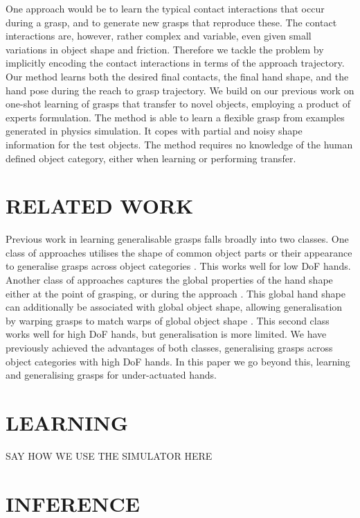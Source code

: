 \documentclass[a4paper, 10pt, conference]{ieeeconf}      %
\begin{document}
One approach would be to learn the typical contact interactions that occur during a grasp, and to generate new grasps that reproduce these. The contact interactions are, however, rather complex and variable, even given small variations in object shape and friction. Therefore we tackle the problem by implicitly encoding the contact interactions in terms of the approach trajectory. Our method learns both the desired final contacts, the final hand shape, and the hand pose during the reach to grasp trajectory. We build on our previous work on one-shot learning of grasps that transfer to novel objects, employing a product of experts formulation. The method is able to learn a flexible grasp from examples generated in physics simulation. It copes with partial and noisy shape information for the test objects. The method requires no knowledge of the human defined object category, either when learning or performing transfer.

\section{RELATED WORK}
Previous work in learning generalisable grasps falls broadly into two classes. One class of approaches utilises the shape of common object parts or their appearance to generalise grasps across object categories \cite{saxena2008b,detry2013a,herzog2014a, kroemer2012a}. This works well for low DoF hands. Another class of approaches captures the global properties of the hand shape either at the point of grasping, or during the approach \cite{ben2012generalization}. This global hand shape can additionally be associated with global object shape, allowing generalisation by warping grasps to match warps of global object shape \cite{hillenbrand2012transferring}. This second class works well for high DoF hands, but generalisation is more limited. We have previously achieved the advantages of both classes, generalising grasps across object categories with high DoF hands. In this paper we go beyond this, learning and generalising grasps for under-actuated hands.



\section{LEARNING}

SAY HOW WE USE THE SIMULATOR HERE

\section{INFERENCE}
\end{document}
